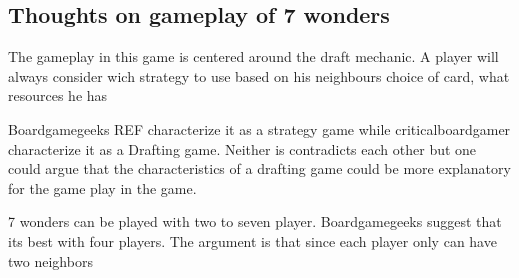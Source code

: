 \documentclass[a4paper]{article}
\begin{document}
\subsection{Thoughts on gameplay of 7 wonders}
The gameplay in this game is centered around the draft mechanic. A player will always consider wich strategy to use based on his neighbours choice of card, what resources he has 

Boardgamegeeks REF characterize it as a strategy game while criticalboardgamer characterize it as a Drafting game. Neither is contradicts each other but one could argue that the characteristics of a drafting game could be more explanatory for the game play in the game.

7 wonders can be played with two to seven player. Boardgamegeeks suggest that its best with four players. The argument is that since each player only can have two neighbors  
\end{document}
